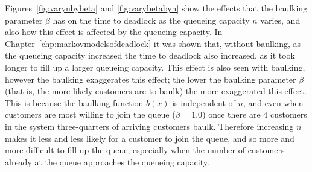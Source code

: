 \documentclass{article}
\begin{document}
Figures~\ref{fig:varynbybeta} and \ref{fig:varybetabyn} show the effects that the baulking parameter $\beta$ has on the time to deadlock as the queueing capacity $n$ varies, and also how this effect is affected by the queueing capacity.
In Chapter~\ref{chp:markovmodelsofdeadlock} it was shown that, without baulking, as the queueing capacity increased the time to deadlock also increased, as it took longer to fill up a larger queueing capacity. This effect is also seen with baulking, however the baulking exaggerates this effect; the lower the baulking parameter $\beta$ (that is, the more likely customers are to baulk) the more exaggerated this effect. This is because the baulking function $b(x)$ is independent of $n$, and even when customers are most willing to join the queue ($\beta = 1.0$) once there are $4$ customers in the system three-quarters of arriving customers baulk. Therefore increasing $n$ makes it less and less likely for a customer to join the queue, and so more and more difficult to fill up the queue, especially when the number of customers already at the queue approaches the queueing capacity.
\end{document}
